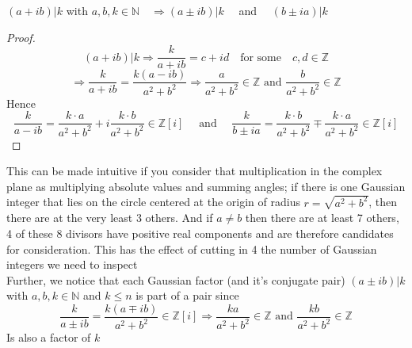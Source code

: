 \documentclass[11pt]{article}
\newcommand{\N}{\mathbb{N}}
\newcommand{\Z}{\mathbb{Z}}
\newcommand{\RA}{\Rightarrow}
\newenvironment{problem}[2][\to]{\begin{trivlist}
\item[\hskip \labelsep {\bfseries #1}\hskip \labelsep {\bfseries #2.}]}{\end{trivlist}}
\begin{document}
\begin{problem}[Observation 1]\\ 
$(a+ib) | k$ with $a,b,k\in\N \quad \RA (a\pm ib) | k\quad$ and $\quad (b \pm ia) | k$
\end{problem}
\begin{proof}
$$
(a+ib)|k \RA \frac{k}{a+ib} = c+id \quad \text{for some}\quad c,d\in \Z
$$
$$
\RA \frac{k}{a+ib} = \frac{k(a-ib)}{a^2 + b^2} \RA \frac{a}{a^2+b^2}\in \Z \text{ and } \frac{b}{a^2+b^2}\in \Z
$$
Hence
$$
\frac{k}{a-ib} = \frac{k\cdot a}{a^2+b^2} + i\frac{k\cdot b}{a^2+b^2} \in \Z[i] 
\quad \text{ and } \quad
\frac{k}{b\pm ia} = \frac{k\cdot b}{a^2+b^2} \mp \frac{k\cdot a}{a^2+b^2} \in \Z[i]
$$
\end{proof}
This can be made intuitive if you consider that multiplication in the complex plane as multiplying absolute values and summing angles; if there is one Gaussian integer that lies on the circle centered at the origin of radius $r = \sqrt{a^2+b^2}$, then there are at the very least 3 others. And if $a\neq b$ then there are at least 7 others, 4 of these 8 divisors have positive real components and are therefore candidates for consideration. This has the effect of cutting in 4 the number of Gaussian integers we need to inspect\\

Further, we notice that each Gaussian factor (and it's conjugate pair) $(a\pm ib) | k$ with $a,b,k\in \N$ and $k \leq n$ is part of a pair since 
$$\frac{k}{a\pm ib} = \frac{k(a\mp ib)}{a^2+b^2} \in\Z[i] \RA \frac{ka}{a^2+b^2}\in\Z \text{ and } \frac{kb}{a^2+b^2}\in\Z$$
Is also a factor of $k$\\

\end{document}
